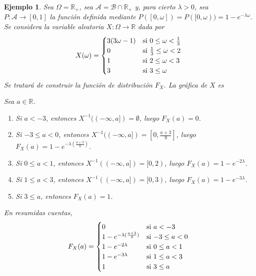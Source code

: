 \documentclass[11pt]{report}
\theoremstyle{mytheorem}
\theoremstyle{mydefinition}
\theoremstyle{myexample}
\newtheorem*{example}{Ejemplo}
\newcommand{\R}{\mathbb R}
\begin{document}
\begin{example}
Sea $\Omega = \R_+$, sea $\mathcal{A} = \mathcal{B} \cap \R_+$ y, para cierto $\lambda >0$, sea $P \colon \mathcal{A} \to [0,1]$ la función definida mediante $P([0,\omega]) = P([0,\omega)) = 1-e^{-\lambda \omega}$. Se considera la variable aleatoria $X \colon \Omega \to \R$ dada por
\[X(\omega) = \begin{cases}
    3(3\omega-1) & $si$ \ 0 \leq \omega < \frac{1}{3} \\
    0 & $si$ \ \frac{1}{3} \leq \omega < 2 \\
    1 & $si$ \ 2 \leq \omega < 3 \\
    3 & $si$ \ 3 \leq \omega
\end{cases}\]
Se tratará de construir la función de distribución $F_X$. La gráfica de $X$ es

\begin{center}
\end{center}

\noindent Sea $a \in \R$.
\begin{enumerate}
    \item Si $a < -3$, entonces $X^{-1}((-\infty,a]) = \emptyset$, luego $F_X(a) = 0$.
    \item Si $-3 \leq a < 0$, entonces $X^{-1}((-\infty,a]) = [0,\frac{a+3}{9}]$, luego $F_X(a) = 1-e^{-\lambda(\frac{a+3}{9})}$.
    \item Si $0 \leq a < 1$, entonces $X^{-1}((-\infty,a]) = [0,2)$, luego $F_X(a) = 1-e^{-2\lambda}$.
    \item Si $1 \leq a <3$, entonces $X^{-1}((-\infty,a]) = [0,3)$, luego $F_X(a) = 1-e^{-3\lambda}$.
    \item Si $3 \leq a$, entonces $F_X(a)=1$.
\end{enumerate}
En resumidas cuentas,
\[
F_X(a)= \begin{cases}
    0 & $si$ \ a < -3 \\
    1-e^{-\lambda(\frac{a+3}{9})} & $si$ \ -3 \leq a < 0 \\
    1-e^{-2\lambda} & $si$ \ 0 \leq a < 1 \\
    1-e^{-3\lambda} & $si$ \ 1 \leq a < 3 \\
    1 & $si$ \ 3 \leq a
\end{cases}
\]


\end{example}
\end{document}
